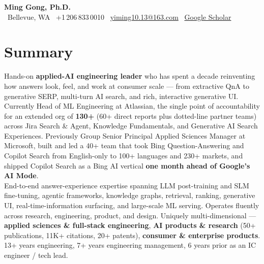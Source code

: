 \documentclass[10.5pt,letterpaper]{article}
\begin{document}
\begin{center}
  {\LARGE\bfseries\color{blue!60!black} Ming Gong, Ph.D.}\\[3pt]
  \faMapMarker* \ Bellevue, WA \quad \textbar \quad
  \faPhone \ +1\,206\,833\,0010 \quad \textbar \quad
  \faEnvelope \ \href{mailto:yiming10.13@163.com}{yiming10.13@163.com} \quad \textbar \quad
  \faGraduationCap \ \href{https://scholar.google.com/citations?user=c7JEFwsAAAAJ}{Google Scholar}
\end{center}

\section*{Summary}
Hands-on \textbf{applied-AI engineering leader} who has spent a decade reinventing how answers look, feel, and work at consumer scale --- from extractive QnA to generative SERP, multi-turn AI search, and rich, interactive generative UI. Currently Head of ML Engineering at Atlassian, the single point of accountability for an extended org of \textbf{130+} (60+ direct reports plus dotted-line partner teams) across Jira Search \& Agent, Knowledge Fundamentals, and Generative AI Search Experiences. Previously Group Senior Principal Applied Sciences Manager at Microsoft, built and led a 40+ team that took Bing Question-Answering and Copilot Search from English-only to 100+ languages and 230+ markets, and shipped Copilot Search as a Bing AI vertical \textbf{one month ahead of Google's AI Mode}.\\[4pt]
End-to-end answer-experience expertise spanning LLM post-training and SLM fine-tuning, agentic frameworks, knowledge graphs, retrieval, ranking, generative UI, real-time-information surfacing, and large-scale ML serving. Operates fluently across research, engineering, product, and design. Uniquely multi-dimensional --- \textbf{applied sciences \& full-stack engineering}, \textbf{AI products \& research} (50+ publications, 11K+ citations, 20+ patents), \textbf{consumer \& enterprise products}. 13+ years engineering, 7+ years engineering management, 6 years prior as an IC engineer / tech lead.

\end{document}
